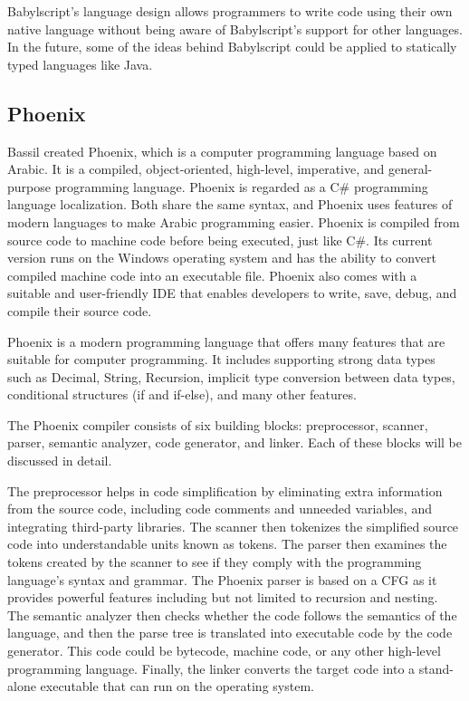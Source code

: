 Babylscript's language design allows programmers to write code using their own native language without being aware of Babylscript's support for other languages. In the future, some of the ideas behind Babylscript could be applied to statically typed languages like Java.
\subsection{Phoenix}
 Bassil \cite{bassil2019phoenix} created Phoenix, which is a computer programming language based on Arabic. It is a compiled, object-oriented, high-level, imperative, and general-purpose programming language. Phoenix is regarded as a C\# programming language localization. Both share the same syntax, and Phoenix uses features of modern languages to make Arabic programming easier. Phoenix is compiled from source code to machine code before being executed, just like C\#. Its current version runs on the Windows operating system and has the ability to convert compiled machine code into an executable file. Phoenix also comes with a suitable and user-friendly IDE that enables developers to write, save, debug, and compile their source code.

Phoenix is a modern programming language that offers many features that are suitable for computer programming. It includes supporting strong data types such as Decimal, String, Recursion, implicit type conversion between data types, conditional structures (if and if-else), and many other features.

The Phoenix compiler consists of six building blocks: preprocessor, scanner, parser, semantic analyzer, code generator, and linker. Each of these blocks will be discussed in detail.

The preprocessor helps in code simplification by eliminating extra information from the source code, including code comments and unneeded variables, and integrating third-party libraries. The scanner then tokenizes the simplified source code into understandable units known as tokens. The parser then examines the tokens created by the scanner to see if they comply with the programming language's syntax and grammar. The Phoenix parser is based on a \ac{CFG} as it provides powerful features including but not limited to recursion and nesting. The semantic analyzer then checks whether the code follows the semantics of the language, and then the parse tree is translated into executable code by the code generator. This code could be bytecode, machine code, or any other high-level programming language. Finally, the linker converts the target code into a stand-alone executable that can run on the operating system. 

